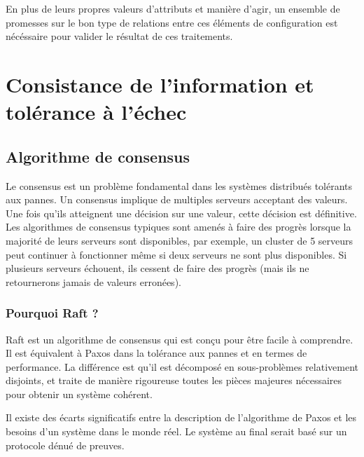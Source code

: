 En plus de leurs propres valeurs d'attributs et manière d'agir, un ensemble de
promesses sur le bon type de relations entre ces éléments de configuration est
nécéssaire pour valider le résultat de ces traitements.

\section{Consistance de l'information et tolérance à l'échec}

\subsection{Algorithme de consensus}
\label{sec:consensus}

Le consensus est un problème fondamental dans les systèmes distribués tolérants
aux pannes. Un consensus implique de multiples serveurs acceptant des valeurs.
Une fois qu'ils atteignent une décision sur une valeur, cette décision est
définitive. Les algorithmes de consensus typiques sont amenés à faire des
progrès lorsque la majorité de leurs serveurs sont disponibles, par exemple, un
cluster de 5 serveurs peut continuer à fonctionner même si deux serveurs ne sont
plus disponibles. Si plusieurs serveurs échouent, ils cessent de faire des
progrès (mais ils ne retournerons jamais de valeurs erronées).

\subsubsection{Pourquoi Raft ?}

Raft est un algorithme de consensus qui est conçu pour être facile à comprendre.
Il est équivalent à Paxos dans la tolérance aux pannes et en termes de
performance. La différence est qu'il est décomposé en sous-problèmes
relativement disjoints, et traite de manière rigoureuse toutes les pièces
majeures nécessaires pour obtenir un système cohérent.

Il existe des écarts significatifs entre la description de l'algorithme de Paxos
et les besoins d'un système dans le monde réel. Le système au final serait basé
sur un protocole dénué de preuves.


